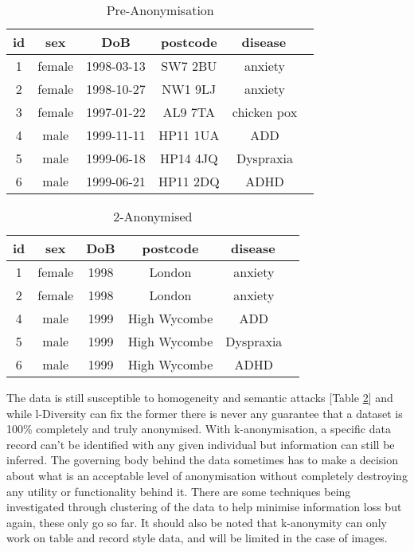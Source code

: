 \begin{center}
    \begin{longtable}{ |c|c|c|c|c| }
    \caption{Pre-Anonymisation}
    \label{tbl:pre-anon}
    \hline
    \textbf{id} & \textbf{sex} & \textbf{DoB} & \textbf{postcode} & \textbf{disease} \ \\ \hline
    1 & female & 1998-03-13 & SW7 2BU & anxiety \ \\ \hline
    2 & female & 1998-10-27 & NW1 9LJ & anxiety \ \\ \hline
    3 & female & 1997-01-22 & AL9 7TA & chicken pox \ \\ \hline
    4 & male & 1999-11-11 & HP11 1UA & ADD \ \\ \hline
    5 & male & 1999-06-18 & HP14 4JQ & Dyspraxia \ \\ \hline
    6 & male & 1999-06-21 & HP11 2DQ & ADHD \ \\ \hline
    \end{longtable}
    
    \begin{longtable}{ |c|c|c|c|c| }
    \caption{2-Anonymised}
    \label{tbl:2-anon}
    \hline
    \textbf{id} & \textbf{sex} & \textbf{DoB} & \textbf{postcode} & \textbf{disease} \ \\ \hline
    \rowcolor{lightgray} 1 & female & 1998 & London & anxiety \ \\ \hline
    \rowcolor{lightgray} 2 & female & 1998 & London & anxiety \ \\ \hline
    \rowcolor{gray} 4 & male & 1999 & High Wycombe & ADD \ \\ \hline
    \rowcolor{gray} 5 & male & 1999 & High Wycombe & Dyspraxia \ \\ \hline
    \rowcolor{gray} 6 & male & 1999 & High Wycombe & ADHD \ \\ \hline
    \end{longtable}
\end{center}

The data is still susceptible to homogeneity and semantic attacks [Table \ref{tbl:2-anon}] and while {l-Diversity} can fix the former there is never any guarantee that a dataset is 100\% completely and truly anonymised. With k-anonymisation, a specific data record can't be identified with any given individual but information can still be inferred. The governing body behind the data sometimes has to make a decision about what is an acceptable level of anonymisation without completely destroying any utility or functionality behind it. There are some techniques being investigated through clustering of the data to help minimise information loss \cite{anon_cluster} but again, these only go so far. It should also be noted that k-anonymity can only work on table and record style data, and will be limited in the case of images.


